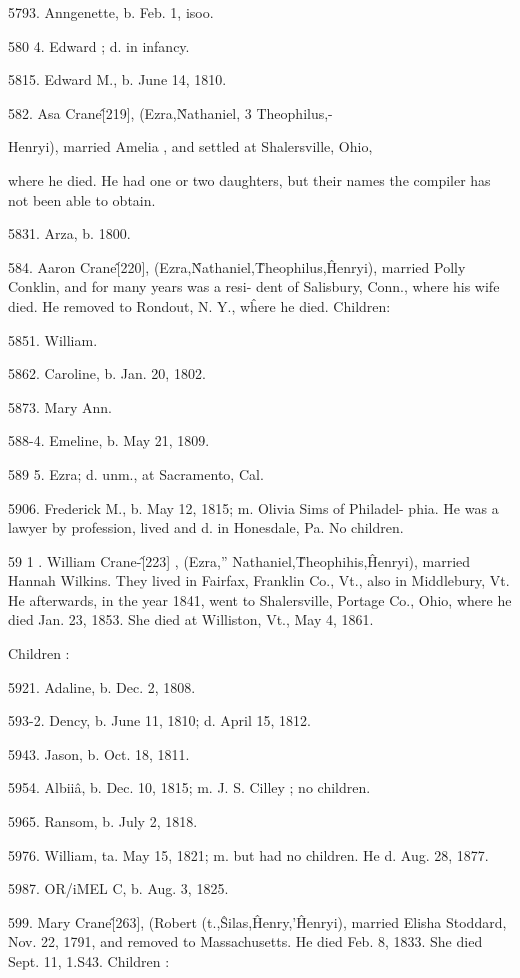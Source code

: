 5793. Anngenette, b. Feb. 1, isoo. 

580  4. Edward ; d. in infancy. 

5815. Edward M., b. June 14, 1810. 

582. Asa Crane\^ [219], (Ezra,\^ Nathaniel, 3 Theophilus,- 

Henryi), married Amelia , and settled at Shalersville, Ohio, 

where he died. He had one or two daughters, but their names 
the compiler has not been able to obtain. 

5831. Arza, b. 1800. 

584. Aaron Crane\^ [220], (Ezra,\^ Nathaniel,\^ Theophilus,\^ 
Henryi), married Polly Conklin, and for many years was a resi- 
dent of Salisbury, Conn., where his wife died. He removed to 
Rondout, N. Y., w\^here he died. Children: 

5851. William. 

5862. Caroline, b. Jan. 20, 1802. 

5873. Mary Ann. 

588-4. Emeline, b. May 21, 1809. 

589  5. Ezra; d. unm., at Sacramento, Cal. 

5906. Frederick M., b. May 12, 1815; m. Olivia Sims of Philadel- 
phia. He was a lawyer by profession, lived and d. in 
Honesdale, Pa. No children. 

59 1 . William Crane-\^ [223] , (Ezra,'' Nathaniel,\^ Theophihis,\^ 
Henryi), married Hannah Wilkins. They lived in Fairfax, 
Franklin Co., Vt., also in Middlebury, Vt. He afterwards, in 
the year 1841, went to Shalersville, Portage Co., Ohio, where he 
died Jan. 23, 1853. She died at Williston, Vt., May 4, 1861. 

Children : 

5921. Adaline, b. Dec. 2, 1808. 

593-2. Dency, b. June 11, 1810; d. April 15, 1812. 

5943. Jason, b. Oct. 18, 1811. 

5954. Albii\^a, b. Dec. 10, 1815; m. J. S. Cilley ; no children. 

5965. Ransom, b. July 2, 1818. 

5976. William, ta. May 15, 1821; m. but had no children. He d. 
Aug. 28, 1877. 

5987. OR/iMEL C, b. Aug. 3, 1825. 

599. Mary Crane\^ [263], (Robert (t.,\^ Silas,\^ Henry,'\^ 
Henryi), married Elisha Stoddard, Nov. 22, 1791, and removed 
to Massachusetts. He died Feb. 8, 1833. She died Sept. 11, 
1.S43. Children : 

